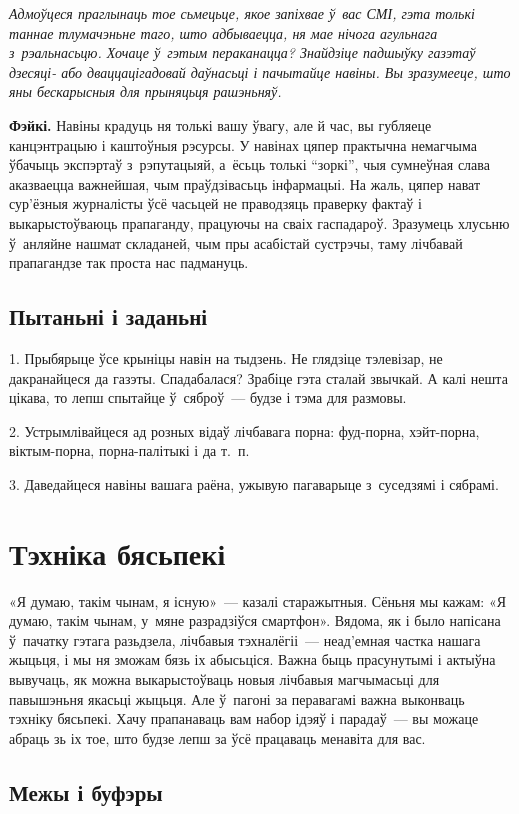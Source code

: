 \emph{Адмоўцеся праглынаць тое сьмецьце, якое запіхвае ў~вас СМІ, гэта толькі таннае тлумачэньне таго, што адбываецца, ня мае нічога агульнага з~рэальнасьцю. Хочаце ў~гэтым пераканацца? Знайдзіце падшыўку газэтаў дзесяці- або дваццацігадовай даўнасьці і пачытайце навіны. Вы зразумееце, што яны бескарысныя для прыняцьця рашэньняў.}

\textbf{Фэйкі.} Навіны крадуць ня толькі вашу ўвагу, але й час, вы губляеце канцэнтрацыю і каштоўныя рэсурсы. У навінах цяпер практычна немагчыма ўбачыць экспэртаў з~рэпутацыяй, а~ёсьць толькі ``зоркі'', чыя сумнеўная слава аказваецца важнейшая, чым праўдзівасьць інфармацыі. На жаль, цяпер нават сур'ёзныя журналісты ўсё часьцей не праводзяць праверку фактаў і выкарыстоўваюць прапаганду, працуючы на сваіх гаспадароў. Зразумець хлусьню ў~анляйне нашмат складаней, чым пры асабістай сустрэчы, таму лічбавай прапагандзе так проста нас падмануць.

\subsection*{Пытаньні і заданьні}

1. Прыбярыце ўсе крыніцы навін на тыдзень. Не глядзіце тэлевізар, не дакранайцеся да газэты. Спадабалася? Зрабіце гэта сталай звычкай. А калі нешта цікава, то лепш спытайце ў~сяброў~--- будзе і тэма для размовы.

2. Устрымлівайцеся ад розных відаў лічбавага порна: фуд-порна, хэйт-порна, віктым-порна, порна-палітыкі і да т.~п.

3. Даведайцеся навіны вашага раёна, ужывую пагаварыце з~суседзямі і сябрамі.


\section{Тэхніка бясьпекі}

«Я думаю, такім чынам, я існую»~--- казалі старажытныя. Сёньня мы кажам: «Я думаю, такім чынам, у~мяне разрадзіўся смартфон». Вядома, як і было напісана ў~пачатку гэтага разьдзела, лічбавыя тэхналёгіі~--- неад'емная частка нашага жыцьця, і мы ня зможам бязь іх абысьціся. Важна быць прасунутымі і актыўна вывучаць, як можна выкарыстоўваць новыя лічбавыя магчымасьці для павышэньня якасьці жыцьця. Але ў~пагоні за перавагамі важна выконваць тэхніку бясьпекі. Хачу прапанаваць вам набор ідэяў і парадаў~--- вы можаце абраць зь іх тое, што будзе лепш за ўсё працаваць менавіта для вас.

\subsection*{Межы і буфэры}

